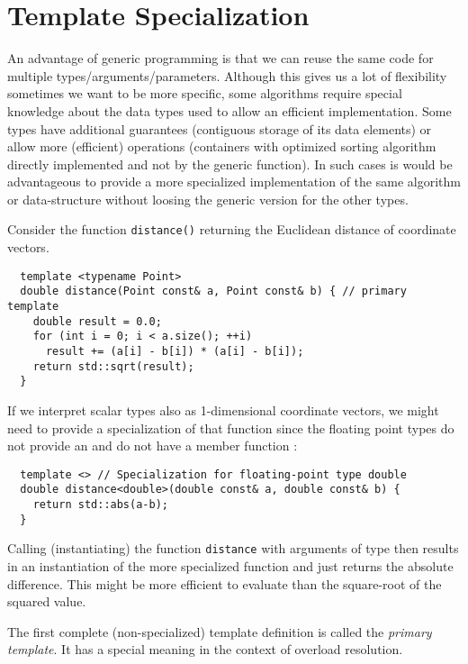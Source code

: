 \chapter{Template Specialization}
An advantage of generic programming is that we can reuse the same code for multiple types/arguments/parameters. Although this gives us a lot of flexibility
sometimes we want to be more specific, \ie some algorithms require special knowledge about the data types used to allow an efficient implementation. Some
types have additional guarantees (\eg contiguous storage of its data elements) or allow more (efficient) operations (\eg containers with optimized sorting
algorithm directly implemented and not by the generic  function). In such cases is would be advantageous to provide a more specialized implementation
of the same algorithm or data-structure without loosing the generic version for the other types.

\begin{example}
  Consider the function \texttt{distance()} returning the Euclidean distance of coordinate vectors.
  \begin{verbatim}
  template <typename Point>
  double distance(Point const& a, Point const& b) { // primary template
    double result = 0.0;
    for (int i = 0; i < a.size(); ++i)
      result += (a[i] - b[i]) * (a[i] - b[i]);
    return std::sqrt(result);
  }
  \end{verbatim}
  If we interpret scalar types also as 1-dimensional coordinate vectors, we might need to provide a specialization of that function
  since the floating point types do not provide an  and do not have a member function :
  \begin{verbatim}
  template <> // Specialization for floating-point type double
  double distance<double>(double const& a, double const& b) {
    return std::abs(a-b);
  }
  \end{verbatim}
  Calling (instantiating) the function \texttt{distance} with arguments of type  then results in an instantiation of the more specialized
  function and just returns the absolute difference. This might be more efficient to evaluate than the square-root of the squared value.
\end{example}

\begin{defn}
  The first complete (non-specialized) template definition is called the \emph{primary template}. It has a special meaning in the context of overload resolution.
\end{defn}

